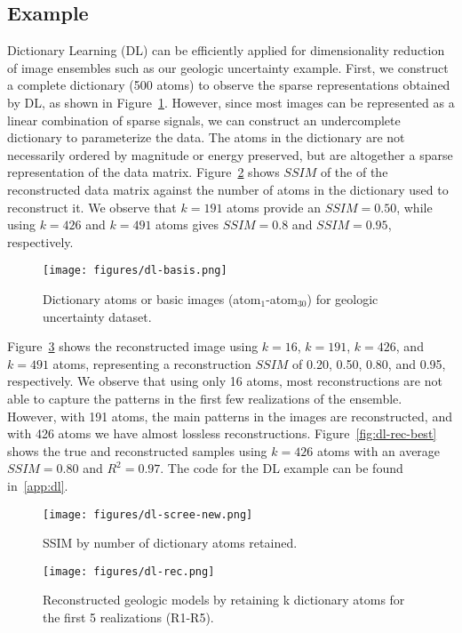 \documentclass[a4paper,fleqn,12pt]{article}
\begin{document}
\subsection*{Example}
Dictionary Learning (DL) can be efficiently applied for dimensionality reduction of image ensembles such as our geologic uncertainty example. First, we construct a complete dictionary (500 atoms) to observe the sparse representations obtained by DL, as shown in Figure~\ref{fig:dl-basis}. However, since most images can be represented as a linear combination of sparse signals, we can construct an undercomplete dictionary to parameterize the data. The atoms in the dictionary are not necessarily ordered by magnitude or energy preserved, but are altogether a sparse representation of the data matrix. Figure~\ref{fig:dl-scree} shows $SSIM$ of the of the reconstructed data matrix against the number of atoms in the dictionary used to reconstruct it. We observe that $k=191$ atoms provide an $SSIM=0.50$, while using $k=426$ and $k=491$ atoms gives $SSIM=0.8$ and $SSIM=0.95$, respectively.

\begin{figure}[H]
    \centering
    \texttt{[image: figures/dl-basis.png]}
    \caption{Dictionary atoms or basic images (atom$_1$-atom$_{30}$) for geologic uncertainty dataset.}
    \label{fig:dl-basis}
\end{figure}

Figure~\ref{fig:dl-rec} shows the reconstructed image using $k=16$, $k=191$, $k=426$, and $k=491$ atoms, representing a reconstruction $SSIM$ of 0.20, 0.50, 0.80, and 0.95, respectively. We observe that using only 16 atoms, most reconstructions are not able to capture the patterns in the first few realizations of the ensemble. However, with 191 atoms, the main patterns in the images are reconstructed, and with 426 atoms we have almost lossless reconstructions. Figure~\ref{fig:dl-rec-best} shows the true and reconstructed samples using $k=426$ atoms with an average $SSIM=0.80$ and $R^2=0.97$. The code for the DL example can be found in~\ref{app:dl}.

\begin{figure}[H]
    \centering
    \texttt{[image: figures/dl-scree-new.png]}
    \caption{SSIM by number of dictionary atoms retained.}
    \label{fig:dl-scree}
\end{figure}

\begin{figure}[H]
    \centering
    \texttt{[image: figures/dl-rec.png]}
    \caption{Reconstructed geologic models by retaining k dictionary atoms for the first 5 realizations (R1-R5).}
    \label{fig:dl-rec}
\end{figure}
\end{document}
